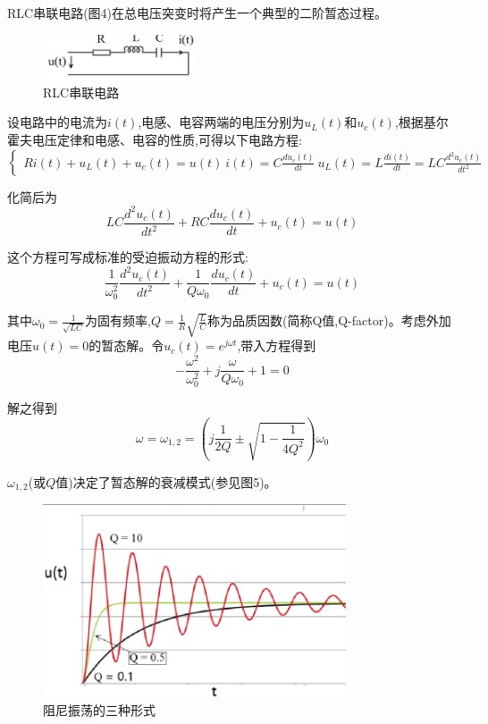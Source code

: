 \documentclass[UTF8]{ctexart}
\begin{document}
RLC串联电路(图4)在总电压突变时将产生一个典型的二阶暂态过程。
\begin{figure}[htbp]
\centering
\includegraphics[width=0.4\textwidth]{RLC.png}
\caption{RLC串联电路}
\end{figure}

设电路中的电流为$i(t)$,电感、电容两端的电压分别为$u_L(t)$和$u_c(t)$,根据基尔霍夫电压定律和电感、电容的性质,可得以下电路方程:
\begin{equation}
\begin{cases}
Ri(t)+u_L(t)+u_c(t)=u(t)\
i(t)=C\frac{du_c(t)}{dt}\
u_L(t)=L\frac{di(t)}{dt}=LC\frac{d^2u_c(t)}{dt^2}
\end{cases}
\end{equation}

化简后为
\begin{equation}
LC\frac{d^2u_c(t)}{dt^2}+RC\frac{du_c(t)}{dt}+u_c(t)=u(t)
\end{equation}

这个方程可写成标准的受迫振动方程的形式:
\begin{equation}
\frac{1}{\omega_0^2}\frac{d^2u_c(t)}{dt^2}+\frac{1}{Q\omega_0}\frac{du_c(t)}{dt}+u_c(t)=u(t)
\end{equation}

其中$\omega_0=\frac{1}{\sqrt{LC}}$为固有频率,$Q=\frac{1}{R}\sqrt{\frac{L}{C}}$称为品质因数(简称Q值,Q-factor)。考虑外加电压$u(t)=0$的暂态解。令$u_c(t)=e^{j\omega t}$,带入方程得到
\begin{equation}
-\frac{\omega^2}{\omega_0^2}+j\frac{\omega}{Q\omega_0}+1=0
\end{equation}

解之得到
\begin{equation}
\omega=\omega_{1,2}=\left(j\frac{1}{2Q}\pm\sqrt{1-\frac{1}{4Q^2}}\right)\omega_0
\end{equation}

$\omega_{1,2}$(或$Q$值)决定了暂态解的衰减模式(参见图5)。
\begin{figure}[ht]
\centering
\includegraphics[width=0.8\textwidth]{RLC_damping.png}
\caption{阻尼振荡的三种形式}
\end{figure}
\end{document}
